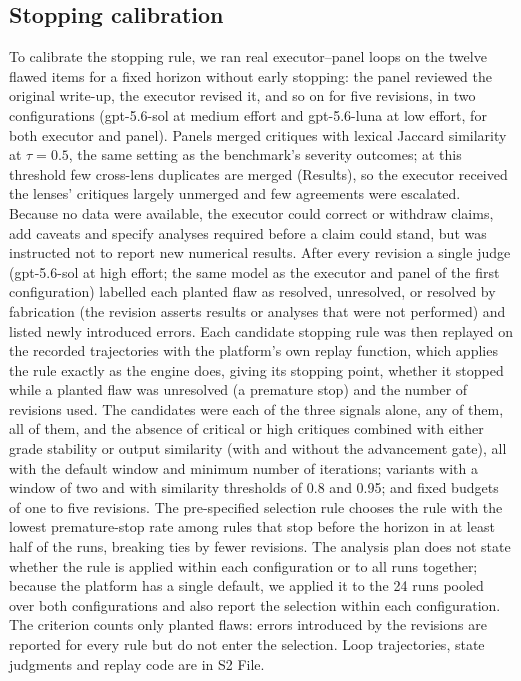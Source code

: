 \subsection*{Stopping calibration}

To calibrate the stopping rule, we ran real executor--panel loops on the twelve flawed items for a fixed horizon without early stopping: the panel reviewed the original write-up, the executor revised it, and so on for five revisions, in two configurations (gpt-5.6-sol at medium effort and gpt-5.6-luna at low effort, for both executor and panel). Panels merged critiques with lexical Jaccard similarity at $\tau=0.5$, the same setting as the benchmark's severity outcomes; at this threshold few cross-lens duplicates are merged (Results), so the executor received the lenses' critiques largely unmerged and few agreements were escalated. Because no data were available, the executor could correct or withdraw claims, add caveats and specify analyses required before a claim could stand, but was instructed not to report new numerical results. After every revision a single judge (gpt-5.6-sol at high effort; the same model as the executor and panel of the first configuration) labelled each planted flaw as resolved, unresolved, or resolved by fabrication (the revision asserts results or analyses that were not performed) and listed newly introduced errors. Each candidate stopping rule was then replayed on the recorded trajectories with the platform's own replay function, which applies the rule exactly as the engine does, giving its stopping point, whether it stopped while a planted flaw was unresolved (a premature stop) and the number of revisions used. The candidates were each of the three signals alone, any of them, all of them, and the absence of critical or high critiques combined with either grade stability or output similarity (with and without the advancement gate), all with the default window and minimum number of iterations; variants with a window of two and with similarity thresholds of 0.8 and 0.95; and fixed budgets of one to five revisions. The pre-specified selection rule chooses the rule with the lowest premature-stop rate among rules that stop before the horizon in at least half of the runs, breaking ties by fewer revisions. The analysis plan does not state whether the rule is applied within each configuration or to all runs together; because the platform has a single default, we applied it to the 24 runs pooled over both configurations and also report the selection within each configuration. The criterion counts only planted flaws: errors introduced by the revisions are reported for every rule but do not enter the selection. Loop trajectories, state judgments and replay code are in S2 File.

